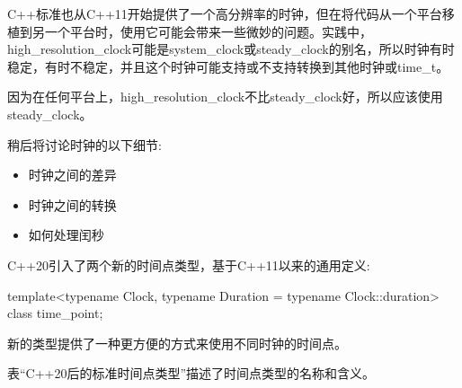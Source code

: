 C++标准也从C++11开始提供了一个高分辨率的时钟，但在将代码从一个平台移植到另一个平台时，使用它可能会带来一些微妙的问题。实践中，high\_resolution\_clock可能是system\_clock或steady\_clock的别名，所以时钟有时稳定，有时不稳定，并且这个时钟可能支持或不支持转换到其他时钟或time\_t。

因为在任何平台上，high\_resolution\_clock不比steady\_clock好，所以应该使用steady\_clock。

稍后将讨论时钟的以下细节:

\begin{itemize}
\item 
时钟之间的差异

\item 
时钟之间的转换

\item 
如何处理闰秒
\end{itemize}


C++20引入了两个新的时间点类型，基于C++11以来的通用定义:

\begin{cpp}
template<typename Clock, typename Duration = typename Clock::duration>
class time_point;
\end{cpp}

新的类型提供了一种更方便的方式来使用不同时钟的时间点。

表“C++20后的标准时间点类型”描述了时间点类型的名称和含义。

